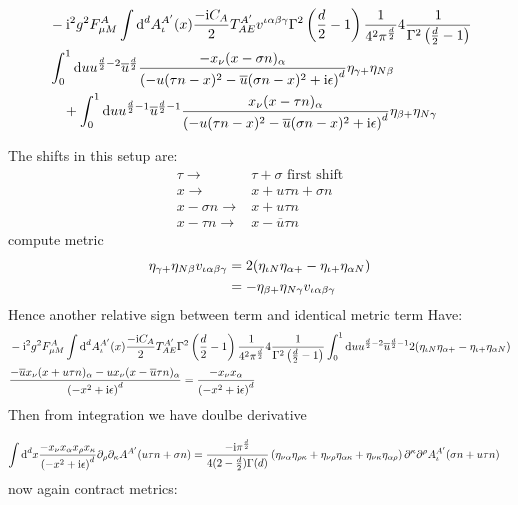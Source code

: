 \begin{align}
	&-\text{i}^2 g^2 F_{\mu M}^{A} \int \text{d} ^d  A_\iota^{A'}(x)\frac{-\text{i} C_A}{2} T^{A'}_{AE}v^{\iota \alpha\beta\gamma}\Gamma^2\left(\frac{d}{2}-1\right)\frac{1}{4^2\pi^\frac{d}{2}}4 \frac{1}{\Gamma^2\left(\frac{d}{2}-1\right)}
	\\
	&\int_0^1 \text{d} u u^{\frac{d}{2}-2}\overline u^{\frac{d}{2}}\frac{-x_\nu(x-\sigma n)_\alpha}{\left(-u(\tau n -x)^2-\overline u(\sigma n -x)^2+\text{i} \epsilon\right)^{d}}\eta_{\gamma +}\eta_{N \beta}
	\\&~~~
	+\int_0^1 \text{d} u u^{\frac{d}{2}-1}\overline u^{\frac{d}{2}-1}\frac{x_\nu(x- \tau  n )_\alpha}{\left(-u(\tau n -x)^2-\overline u(\sigma n -x)^2+\text{i} \epsilon\right)^{d}}\eta_{\beta +}\eta_{N \gamma}
\end{align}

The shifts in this setup are:
\begin{align}
	\tau \rightarrow &\tau + \sigma \text{   first shift}
	\\
	x \rightarrow & x + u\tau n + \sigma n
	\\
	x-\sigma n \rightarrow & x + u \tau n
	\\
	x-\tau n \rightarrow & x  - \overline u \tau n 
\end{align}
compute metric
\begin{align}
	\eta_{\gamma +}\eta_{N \beta}v_{\iota \alpha \beta\gamma} 
	&=
	2(\eta_{\iota N}\eta_{\alpha +} - \eta_{\iota+ }\eta_{\alpha N})
	\\
	&=
	-\eta_{\beta +}\eta_{N \gamma}v_{\iota \alpha \beta\gamma} 
\end{align}
Hence another relative sign between term and identical metric term
Have:
\begin{align}
	&-\text{i}^2 g^2 F_{\mu M}^{A} \int \text{d} ^d  A_\iota^{A'}(x)\frac{-\text{i} C_A}{2} T^{A'}_{AE}\Gamma^2\left(\frac{d}{2}-1\right)\frac{1}{4^2\pi^\frac{d}{2}}4 \frac{1}{\Gamma^2\left(\frac{d}{2}-1\right)}\int_0^1 \text{d} u u^{\frac{d}{2}-2}\overline u^{\frac{d}{2}-1}2(\eta_{\iota N}\eta_{\alpha +} - \eta_{\iota+ }\eta_{\alpha N})
	\\
	&\frac{-\overline u x_\nu(x+u \tau  n)_\alpha- u x_\nu(x - \overline u \tau n )_\alpha }{\left(-x^2+\text{i} \epsilon\right)^{d}} =\frac{-x_\nu x_\alpha}{\left(-x^2+\text{i} \epsilon\right)^{d}}
\end{align}
Then from integration we have doulbe derivative

\begin{align}
	\int \text{d} ^d x \frac{-x_\nu x_\alpha x_\rho x_\kappa}{\left(-x^2+\text{i} \epsilon\right)^{d}} \partial_\rho \partial_\kappa A^{A'}(u\tau n + \sigma n)
	&=
	\frac{-\text{i} \pi^{\frac{d}{2}}}{4(2-\frac{d}{2})\Gamma(d)}\left(  \eta_{\nu \alpha} \eta_{\rho \kappa}+ \eta_{\nu \rho} \eta_{\alpha\kappa} + \eta_{\nu \kappa} \eta_{\alpha \rho} \right) \partial^\kappa\partial^\rho A_\iota^{A'} (\sigma n+u\tau n)
\end{align}
now again contract metrics: 

